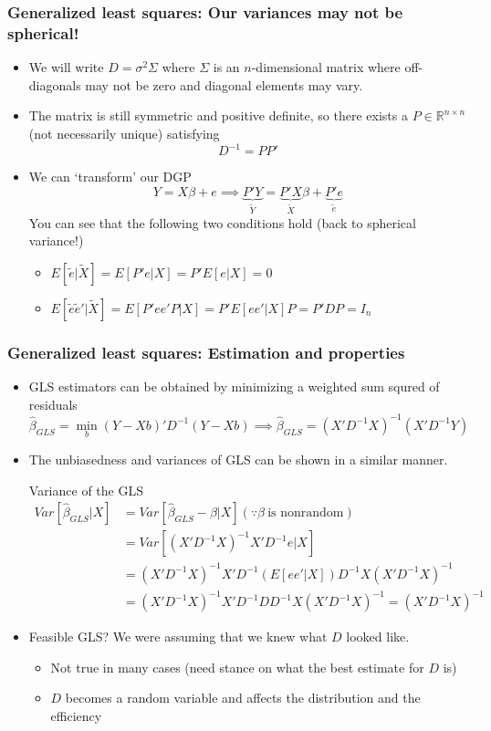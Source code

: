 \documentclass[aspectratio=169]{beamer}
\begin{document}
\begin{frame}
\frametitle{Generalized least squares: Our variances may not be spherical!}
\begin{itemize}
\item We will write $D=\sigma^2\Sigma$ where $\Sigma$ is an $n$-dimensional matrix where off-diagonals may not be zero and diagonal elements may vary. 
\item The matrix is still symmetric and positive definite, so there exists a $P\in\mathbb{R}^{n\times n}$ (not necessarily unique) satisfying
\[
D^{-1}= PP'
\]
\item We can `transform' our DGP
\[
Y=X\beta+e \implies \underbrace{P'Y}_{\tilde{Y}}=\underbrace{P'X}_{\tilde{X}}\beta+\underbrace{P'e}_{\tilde{e}}
\]
You can see that the following two conditions hold (back to spherical variance!)
\begin{itemize}
\item $E[\tilde{e}|\tilde{X}]=E[P'e|X]=P'E[e|X]=0$
\item $E[\tilde{e}\tilde{e}'|\tilde{X}]=E[P'ee'P|X]=P'E[ee'|X]P=P'DP=I_n$
\end{itemize}
\end{itemize}
\end{frame}

\begin{frame}
\frametitle{Generalized least squares: Estimation and properties}
\begin{itemize}
\item  GLS estimators can be obtained by minimizing a weighted sum squred of residuals
\[
\hat{\beta}_{GLS} = \min_b (Y-Xb)'D^{-1}(Y-Xb) \implies \hat{\beta}_{GLS}=(X'D^{-1}X)^{-1}(X'D^{-1}Y)
\]
\item The unbiasedness and variances of GLS can be shown in a similar manner.
\begin{block}{Variance of the GLS}
\[
\begin{aligned}
Var[\hat{\beta}_{GLS}|X]&=Var[\hat{\beta}_{GLS}-\beta|X] (\because \beta\ \text{is nonrandom})\\
 &=Var[(X'D^{-1}X)^{-1}X'D^{-1}e|X] \\
 &=(X'D^{-1}X)^{-1}X'D^{-1}(E[ee'|X])D^{-1}X(X'D^{-1}X)^{-1} \\
 &=(X'D^{-1}X)^{-1}X'D^{-1}DD^{-1}X(X'D^{-1}X)^{-1} =(X'D^{-1}X)^{-1}
\end{aligned}
\] 
\end{block}
\item Feasible GLS? We were assuming that we knew what $D$ looked like. 
\begin{itemize}
\item Not true in many cases (need stance on what the best estimate for $D$ is)
\item $D$ becomes a random variable and affects the distribution and the efficiency
\end{itemize}
\end{itemize}
\end{frame}
\end{document}
